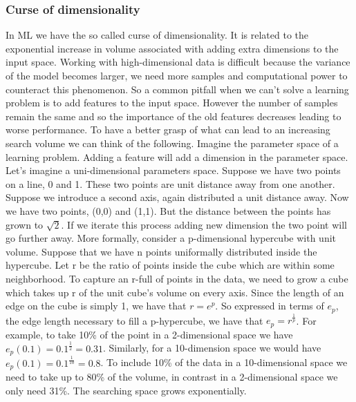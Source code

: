 \documentclass[main.tex]{subfiles}
\begin{document}
\subsubsection{Curse of dimensionality} In ML we have the so called curse of dimensionality. It is related to the exponential increase in volume associated with adding extra dimensions to the input space. Working with high-dimensional data is difficult because the variance of the model becomes larger, we need more samples and computational power to counteract this phenomenon. So a common pitfall when we can't solve a learning problem is to add features to the input space. However the number of samples remain the same and so the importance of the old features decreases leading to worse performance. To have a better grasp of what can lead to an increasing search volume we can think of the following. Imagine the parameter space of a learning problem. Adding a feature will add a dimension in the parameter space. Let's imagine a uni-dimensional parameters space. Suppose we have two points on a line, 0 and 1. These two points are unit distance away from one another. Suppose we introduce a second axis, again distributed a unit distance away. Now we have two points, (0,0) and (1,1). But the distance between the points has grown to $\sqrt{2}$. If we iterate this process adding new dimension the two point will go further away. More formally, consider a p-dimensional hypercube with unit volume. Suppose that we have n points uniformally distributed inside the hypercube. Let r be the ratio of points inside the cube which are within some neighborhood. To capture an r-full of points in the data, we need to grow a cube which takes up r of the unit cube's volume on every axis. Since the length of an edge on the cube is simply 1, we have that $r=e^p$.
So expressed in terms of $e_p$, the edge length necessary to fill a p-hypercube, we have that $e_p=r^{\frac{1}{p}}$. For example, to take 10\% of the point in a 2-dimensional space we have $e_p(0.1)=0.1^{\frac{1}{2}}=0.31$. Similarly, for a 10-dimension space we would have $e_p(0.1)=0.1^{\frac{1}{10}}=0.8$. To include 10\% of the data in a 10-dimensional space we need to take up to 80\% of the volume, in contrast in a 2-dimensional space we only need 31\%. The searching space grows exponentially.
\end{document}

